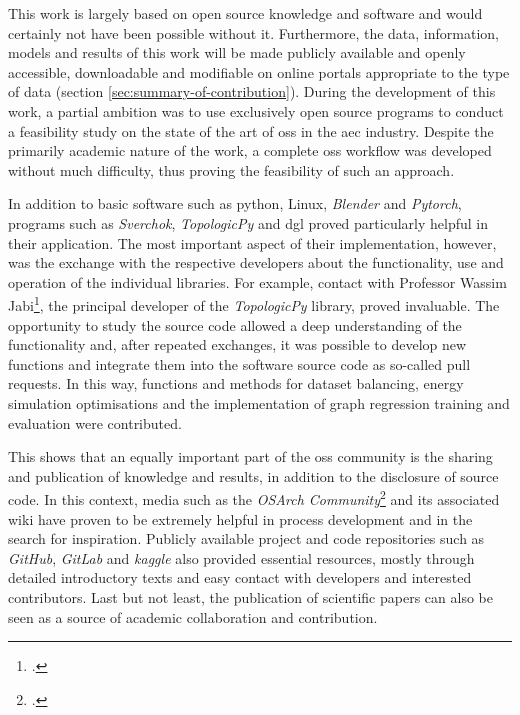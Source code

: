 \documentclass[a4paper, 12pt]{report}
\begin{document}
This work is largely based on \gls{open source} knowledge and software and would certainly not have been possible without it. Furthermore, the data, information, models and results of this work will be made publicly available and openly accessible, downloadable and modifiable on online portals appropriate to the type of data (section \ref{sec:summary-of-contribution}). During the development of this work, a partial ambition was to use exclusively \gls{open source} programs to conduct a feasibility study on the state of the art of \acrshort{oss} in the \acrshort{aec} industry. Despite the primarily academic nature of the work, a complete \acrshort{oss} workflow was developed without much difficulty, thus proving the feasibility of such an approach.

In addition to basic software such as \Gls{python}, Linux, \textit{Blender} and \textit{Pytorch}, programs such as \textit{Sverchok}, \textit{TopologicPy} and \acrshort{dgl} proved particularly helpful in their application. The most important aspect of their implementation, however, was the exchange with the respective developers about the functionality, use and operation of the individual libraries. For example, contact with Professor Wassim Jabi\footcite{jabi2013parametric}, the principal developer of the \textit{TopologicPy} library, proved invaluable. The opportunity to study the source code allowed a deep understanding of the functionality and, after repeated exchanges, it was possible to develop new functions and integrate them into the software source code as so-called pull requests. In this way, functions and methods for dataset balancing, energy simulation optimisations and the implementation of graph regression training and evaluation were contributed.

This shows that an equally important part of the \acrshort{oss} community is the sharing and publication of knowledge and results, in addition to the disclosure of source code. In this context, media such as the \textit{OSArch Community}\footcite{osarch2020} and its associated wiki have proven to be extremely helpful in process development and in the search for inspiration. Publicly available project and code repositories such as \textit{GitHub}, \textit{GitLab} and \textit{kaggle} also provided essential resources, mostly through detailed introductory texts and easy contact with developers and interested contributors. Last but not least, the publication of scientific papers can also be seen as a source of academic collaboration and contribution.
\end{document}
